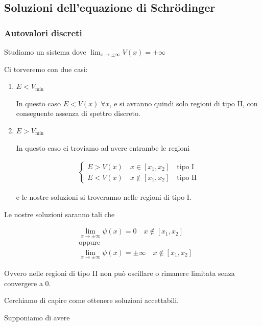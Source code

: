 \newpage

\subsection{Soluzioni dell'equazione di Schrödinger}

\subsubsection{Autovalori discreti}

Studiamo un sistema dove $\lim_{x \rightarrow \pm \infty}V(x)= +\infty$

Ci torveremo con due casi:

\begin{enumerate}
	\item $E<V_{\text{min}}$
	
	In questo caso $E<V(x) \; \forall x$, e si avranno quindi solo regioni di tipo II, con conseguente assenza di spettro discreto.
	
	\item $E>V_{\text{min}}$

	In questo caso ci troviamo ad avere entrambe le regioni

		\begin{align}
			\left\{
			\begin{array}{cc}
				E> V(x) \quad x \in [x_1 , x_2] \quad \text{tipo I }\\
				E< V(x) \quad x \notin [x_1 , x_2] \quad \text{tipo II}
			\end{array}
			\right.
		\end{align}

	e le nostre soluzioni si troveranno nelle regioni di tipo I.
\end{enumerate}

Le nostre soluzioni saranno tali che

\begin{align}
{}&\lim_{x \rightarrow \pm \infty} \psi(x)=0 \quad x \notin [x_1, x_2] \\
& \text{oppure} \nonumber \\
&\lim_{x \rightarrow \pm \infty} \psi(x)=\pm \infty \quad x \notin [x_1, x_2]
\end{align}

Ovvero nelle regioni di tipo II non può oscillare o rimanere limitata senza convergere a 0.

Cerchiamo di capire come ottenere soluzioni accettabili. 

Supponiamo di avere 

